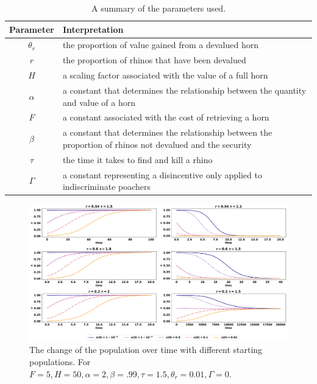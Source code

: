 \documentclass[10pt]{article}
\begin{document}
\begin{table}[!hbtp]
    \begin{center}
        \begin{tabular}{cl}
            \toprule
            Parameter      & Interpretation                \\
            \midrule
            $\theta_r$     & the proportion of value gained from a devalued horn \\
            $r$            & the proportion of rhinos that have been devalued\\
            $H$            & a scaling factor associated with the value of a full horn\\
            $\alpha$       & a constant that determines the relationship between the quantity and value of a horn \\
            $F$            & a constant associated with the cost of retrieving a horn\\
            $\beta$        & a constant that determines the relationship between the proportion of rhinos not devalued and the security\\
            $\tau$         & the time it takes to find and kill a rhino\\
            $\Gamma$       & a constant representing a disincentive only applied to indiscriminate poachers \\
            \bottomrule
        \end{tabular}
    \end{center}
    \caption{A summary of the parameters used.}\label{tbl:parameters}
\end{table}

\begin{figure}[!htbp]
    \includegraphics[width=\textwidth]{images/evolution_of_system.pdf}
    \caption{\label{fig:evolution_of_system} The change of the population over
    time with different starting populations. For \(F=5, H=50,
    \alpha=2, \beta=.99, \tau=1.5, \theta_r=0.01, \Gamma=0\).}
\end{figure}
\end{document}
